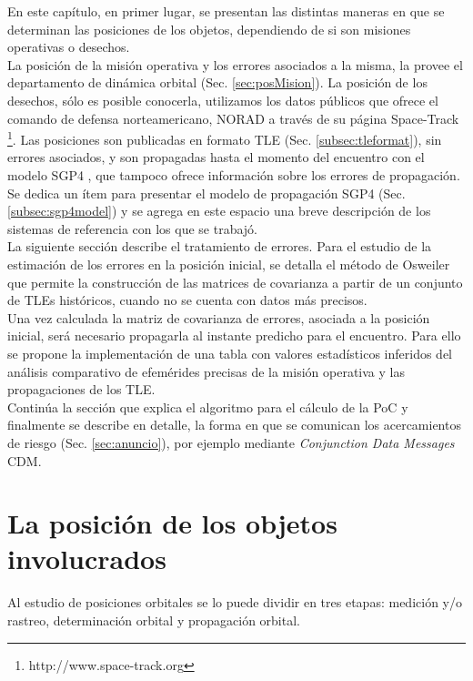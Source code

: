En este cap\'itulo, en primer lugar, se presentan las distintas maneras en que se determinan las posiciones de los objetos, dependiendo de si son misiones operativas o desechos.\\
La posici\'on de la misi\'on operativa y los errores asociados a la misma, la provee el departamento de din\'amica orbital (Sec. \ref{sec:posMision}).
La posici\'on de los desechos, s\'olo es posible conocerla, utilizamos los datos p\'ublicos que ofrece el comando de defensa norteamericano, \ac{NORAD} a trav\'es de su p\'agina Space-Track {\footnote{http://www.space-track.org}}. Las posiciones son publicadas en formato \ac{TLE} (Sec. \ref{subsec:tleformat}), sin errores asociados, y son propagadas hasta el momento del encuentro con el modelo SGP4  \citep{hoots1980models}, que tampoco ofrece informaci\'on sobre los errores de propagaci\'on. Se dedica un \'item para presentar el modelo de propagaci\'on SGP4 (Sec. \ref{subsec:sgp4model}) y se agrega en este espacio una breve descripci\'on de los sistemas de referencia con los que se trabaj\'o.\\

La siguiente secci\'on describe el tratamiento de errores. Para el estudio de la estimaci\'on de los errores en la posici\'on inicial, se detalla el m\'etodo de Osweiler \citep{osweiler} que permite la construcci\'on de las matrices de covarianza a partir de un conjunto de TLEs hist\'oricos, cuando no se cuenta con datos m\'as precisos.\\

Una vez calculada la matriz de covarianza de errores, asociada a la posici\'on inicial, ser\'a necesario propagarla al instante predicho para el encuentro. Para ello se propone la implementaci\'on de una tabla con valores estad\'isticos inferidos del an\'alisis comparativo de efem\'erides precisas de la misi\'on operativa y las propagaciones de los TLE.\\

Contin\'ua la secci\'on que explica el algoritmo para el c\'alculo de la PoC y finalmente se describe en detalle, la forma en que se comunican los acercamientos de riesgo (Sec. \ref{sec:anuncio}), por ejemplo mediante {\it{Conjunction Data Messages}} \ac{CDM}.


\section{La posici\'on de los objetos involucrados}{\label{sec:posMision}}
Al estudio de posiciones orbitales se lo puede dividir en tres etapas: medici\'on y/o rastreo, determinaci\'on orbital y propagaci\'on orbital.

